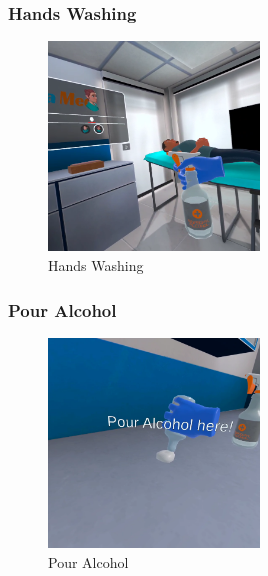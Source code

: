 \subsubsection{Hands Washing}
\begin{figure}[h]
	\centering
     \includegraphics[width=0.5\textwidth, height=0.3\textheight]{Images/Washing hands.png}
	\caption{Hands Washing}
	\label{fig:Hands Washing}
\end{figure}

\subsubsection{Pour Alcohol}
\begin{figure}[h]
	\centering
	\includegraphics[width=0.5\textwidth, height=0.3\textheight]{Images/Pour Alcohol.png}
	\caption{Pour Alcohol}
	\label{fig:Pour-Alcohol}
\end{figure}

